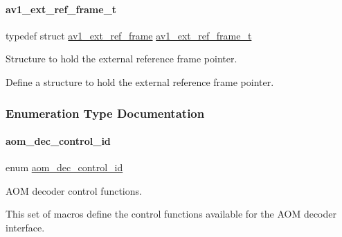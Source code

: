 \paragraph{\texorpdfstring{av1\+\_\+ext\+\_\+ref\+\_\+frame\+\_\+t}{av1\_ext\_ref\_frame\_t}}
{\footnotesize\ttfamily typedef struct \hyperlink{structav1__ext__ref__frame}{av1\+\_\+ext\+\_\+ref\+\_\+frame}  \hyperlink{group__aom__decoder_ga83fa00a891fa821cd5eb1c15ffd7287b}{av1\+\_\+ext\+\_\+ref\+\_\+frame\+\_\+t}}



Structure to hold the external reference frame pointer. 

Define a structure to hold the external reference frame pointer. 

\subsubsection{Enumeration Type Documentation}
\mbox{\label{group__aom__decoder_ga3865fd4b3192489baa9a5c3632ebe97b}} 
\paragraph{\texorpdfstring{aom\+\_\+dec\+\_\+control\+\_\+id}{aom\_dec\_control\_id}}
{\footnotesize\ttfamily enum \hyperlink{group__aom__decoder_ga3865fd4b3192489baa9a5c3632ebe97b}{aom\+\_\+dec\+\_\+control\+\_\+id}}



A\+OM decoder control functions. 

This set of macros define the control functions available for the A\+OM decoder interface.

